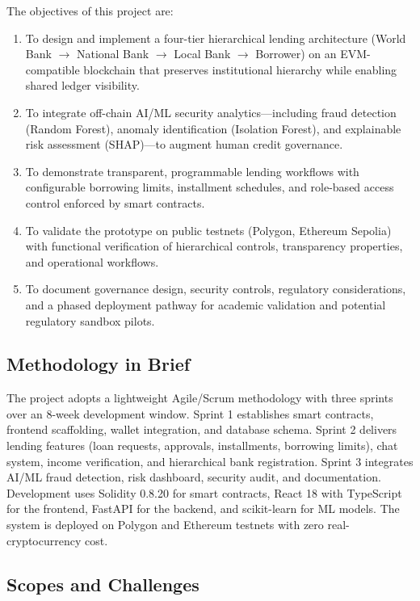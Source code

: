 \documentclass[11pt,a4paper]{article}
\begin{document}
The objectives of this project are:

\begin{enumerate}[noitemsep]
\item To design and implement a four-tier hierarchical lending architecture (World Bank $\to$ National Bank $\to$ Local Bank $\to$ Borrower) on an EVM-compatible blockchain that preserves institutional hierarchy while enabling shared ledger visibility.
\item To integrate off-chain AI/ML security analytics---including fraud detection (Random Forest), anomaly identification (Isolation Forest), and explainable risk assessment (SHAP)---to augment human credit governance.
\item To demonstrate transparent, programmable lending workflows with configurable borrowing limits, installment schedules, and role-based access control enforced by smart contracts.
\item To validate the prototype on public testnets (Polygon, Ethereum Sepolia) with functional verification of hierarchical controls, transparency properties, and operational workflows.
\item To document governance design, security controls, regulatory considerations, and a phased deployment pathway for academic validation and potential regulatory sandbox pilots.
\end{enumerate}

\subsection{Methodology in Brief}

The project adopts a lightweight Agile/Scrum methodology with three sprints over an 8-week development window. Sprint 1 establishes smart contracts, frontend scaffolding, wallet integration, and database schema. Sprint 2 delivers lending features (loan requests, approvals, installments, borrowing limits), chat system, income verification, and hierarchical bank registration. Sprint 3 integrates AI/ML fraud detection, risk dashboard, security audit, and documentation. Development uses Solidity 0.8.20 for smart contracts, React 18 with TypeScript for the frontend, FastAPI for the backend, and scikit-learn for ML models. The system is deployed on Polygon and Ethereum testnets with zero real-cryptocurrency cost.

\subsection{Scopes and Challenges}
\end{document}
